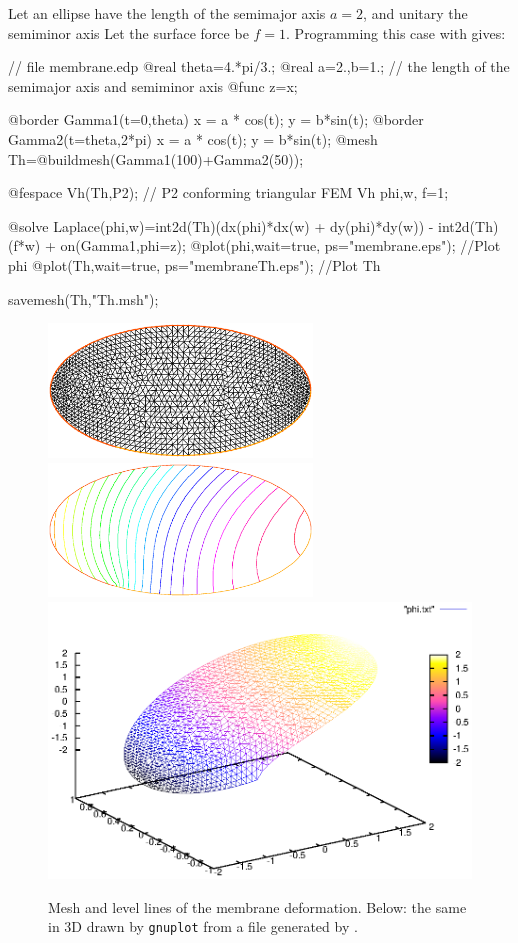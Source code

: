 \documentclass[a4paper,twoside,12pt]{book}
\begin{document}
Let an ellipse have the length of the semimajor axis $a=2$, and unitary the semiminor axis
Let the surface force be $f=1$. Programming this case with
\freefempp gives:
%
\begin{example}
\bFF
// file membrane.edp
@real theta=4.*pi/3.;
@real a=2.,b=1.; // the length of the semimajor axis and  semiminor axis
@func z=x;

@border Gamma1(t=0,theta)    { x = a * cos(t); y = b*sin(t); }
@border Gamma2(t=theta,2*pi) { x = a * cos(t); y = b*sin(t); }
@mesh Th=@buildmesh(Gamma1(100)+Gamma2(50));

@fespace Vh(Th,P2); // P2 conforming triangular FEM
Vh phi,w, f=1;

@solve Laplace(phi,w)=int2d(Th)(dx(phi)*dx(w) + dy(phi)*dy(w))
                - int2d(Th)(f*w) + on(Gamma1,phi=z);
@plot(phi,wait=true, ps="membrane.eps"); //Plot phi
@plot(Th,wait=true, ps="membraneTh.eps"); //Plot Th

savemesh(Th,"Th.msh");
\eFF
\end{example}
\begin{figure}[htbp]
\begin{center}
\includegraphics[width=7cm]{membraneTh}~~~
\includegraphics[width=7cm]{membrane}\\
\includegraphics[width=12cm]{gnumembrane}\\
\caption{\label{figmembrane} Mesh and level lines of the membrane deformation. Below: the same in 3D
drawn by \texttt{gnuplot} from a file generated by \freefempp.}
\end{center}
\end{figure}
\end{document}
